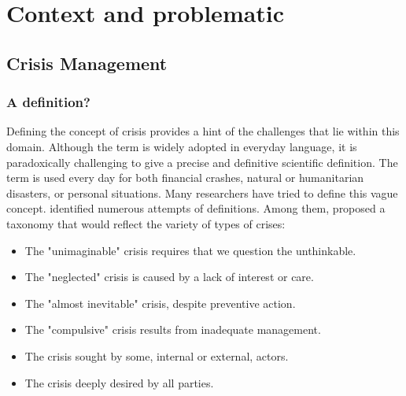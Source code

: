 \chapter{Context and problematic}

\section{Crisis Management}
\subsection{A definition?}
Defining the concept of crisis provides a hint of the challenges that lie within this domain.
Although the term is widely adopted in everyday language, it is paradoxically challenging to give a precise and definitive scientific definition.
The term is used every day for both financial crashes, natural or humanitarian disasters, or personal situations.
Many researchers have tried to define this vague concept.
\textcite{lagadecGESTIONCRISES1994} identified numerous attempts of definitions.
Among them, \textcite{rosenthalCrisisDecisionMakingNetherlands1986} proposed a taxonomy that would reflect the variety of types of crises:

\begin{itemize}
    \item The "unimaginable" crisis requires that we question the unthinkable.
    \item The "neglected" crisis is caused by a lack of interest or care.
    \item The "almost inevitable" crisis, despite preventive action.
    \item The "compulsive" crisis results from inadequate management.
    \item The crisis sought by some, internal or external, actors.
    \item The crisis deeply desired by all parties.
\end{itemize}

